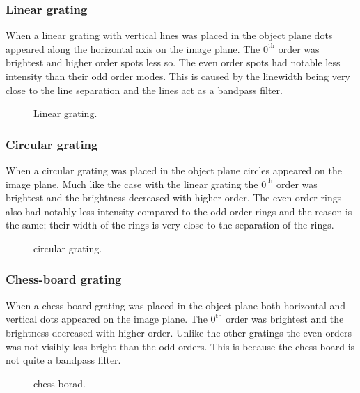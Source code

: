 \documentclass[12pt,a4paper]{article}
\begin{document}
\subsubsection{Linear grating}
When a linear grating with vertical lines was placed in the object plane dots appeared along the horizontal axis on the image plane. The $0^\text{th}$ order was brightest and higher order spots less so. The even order spots had notable less intensity than their odd order modes. This is caused by the linewidth being very close to the line separation and the lines act as a bandpass filter.
\begin{figure}
  \centering
  \noindent\makebox[\textwidth]{\scalebox{0.70}{}}
  \caption{Linear grating.}
  \label{fig:linear_grating}
\end{figure}

\subsubsection{Circular grating}
When a circular grating was placed in the object plane circles appeared on the image plane. Much like the case with the linear grating the $0^\text{th}$ order was brightest and the brightness decreased with higher order. The even order rings also had notably less intensity compared to the odd order rings and the reason is the same; their width of the rings is very close to the separation of the rings.
\begin{figure}
  \centering
  \noindent\makebox[\textwidth]{\scalebox{0.70}{}}
  \caption{circular grating.}
  \label{fig:circular_grating}
\end{figure}

\subsubsection{Chess-board grating}
When a chess-board grating was placed in the object plane both horizontal and vertical dots appeared on the image plane. The $0^\text{th}$ order was brightest and the brightness decreased with higher order. Unlike the other gratings the even orders was not visibly less bright than the odd orders. This is because the chess board is not quite a bandpass filter.
\begin{figure}
  \centering
  \noindent\makebox[\textwidth]{\scalebox{0.70}{}}
  \caption{chess borad.}
  \label{fig:chess_board}
\end{figure}
\end{document}
